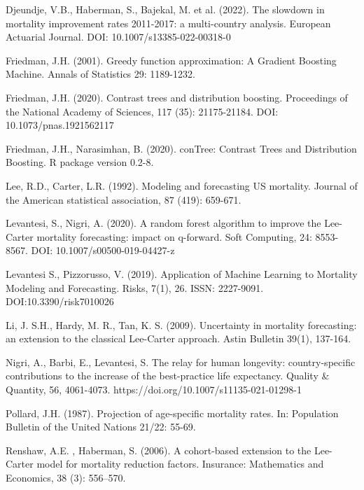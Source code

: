 \documentclass[a4,11pt]{article}
\begin{document}
\begin{thebibliography}{99}
Djeundje, V.B., Haberman, S., Bajekal, M. et al. (2022). The slowdown in mortality improvement rates 2011-2017: a multi-country analysis. European Actuarial Journal. DOI: 10.1007/s13385-022-00318-0

Friedman, J.H. (2001). Greedy function approximation: A Gradient Boosting Machine. Annals of Statistics 29: 1189-1232.

Friedman, J.H. (2020). Contrast trees and distribution boosting. Proceedings of the National Academy of Sciences, 117 (35): 21175-21184. DOI: 10.1073/pnas.1921562117

Friedman, J.H., Narasimhan, B. (2020). conTree: Contrast Trees and Distribution Boosting. R package version 0.2-8.

Lee, R.D., Carter, L.R. (1992). Modeling and forecasting US mortality. Journal of the American statistical association, 87 (419): 659-671.

Levantesi, S., Nigri, A. (2020). A random forest algorithm to improve the Lee-Carter mortality forecasting: impact on q-forward. Soft Computing, 24: 8553-8567. DOI: 10.1007/s00500-019-04427-z

Levantesi S., Pizzorusso, V. (2019). Application of Machine Learning to Mortality Modeling and Forecasting. Risks, 7(1), 26. ISSN: 2227-9091. DOI:10.3390/risk7010026

Li, J. S.H.,  Hardy, M. R., Tan, K. S. (2009). Uncertainty in mortality forecasting: an extension to the classical Lee-Carter approach. Astin Bulletin 39(1), 137-164.

Nigri, A., Barbi, E., Levantesi, S. The relay for human longevity: country-specific contributions to the increase of the best-practice life expectancy. Quality \& Quantity, 56, 4061-4073. https://doi.org/10.1007/s11135-021-01298-1

Pollard, J.H. (1987). Projection of age-specific mortality rates. In: Population Bulletin of the United Nations 21/22: 55-69.

Renshaw, A.E. , Haberman, S. (2006). A cohort-based extension to the Lee-Carter model for mortality reduction factors. Insurance: Mathematics and Economics, 38 (3): 556–570.


\end{thebibliography}
\end{document}
